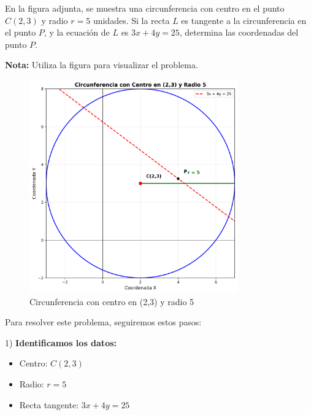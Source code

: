 \begin{ejercicio}[
  id=MATU_GEO_010,
  materia_principal=matematicas_preuniversitaria,
  codigo_materia=MATU,
  capitulo=geometria,
  subtema=circunferencia,
  nivel=intermedio,
  procedencia="Examen UNI 2024",
  visibilidad=web_impreso,
  tiempo_estimado=5,
  libros={geometria_pre, geometria_avanzado},
  dificultad=2,
  tags={circunferencia},
  youtube_url="https://www.youtube.com/watch?v=ejemplo_geometria",
  mostrar_solucion=true,
  libro_promocion=""
]
En la figura adjunta, se muestra una circunferencia con centro en el punto $C(2,3)$ y radio $r = 5$ unidades. Si la recta $L$ es tangente a la circunferencia en el punto $P$, y la ecuación de $L$ es $3x + 4y = 25$, determina las coordenadas del punto $P$.

\textbf{Nota:} Utiliza la figura para visualizar el problema.

\begin{figure}[h]
\centering
\includegraphics[width=0.8\textwidth]{imagenes/circulo_001.png}
\caption{Circunferencia con centro en (2,3) y radio 5}
\label{fig:circulo}
\end{figure}

\begin{solucion}
Para resolver este problema, seguiremos estos pasos:

1) \textbf{Identificamos los datos:}
   \begin{itemize}
   \item Centro: $C(2,3)$
   \item Radio: $r = 5$
   \item Recta tangente: $3x + 4y = 25$
   \end{itemize}


\end{solucion}
\end{ejercicio}
